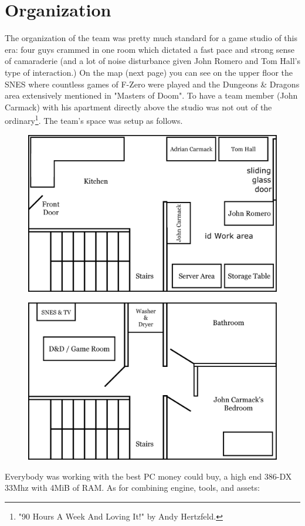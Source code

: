 \documentclass[book.tex]{subfiles}
\begin{document}
\section{Organization}
The organization of the team was pretty much standard for a game studio of this era: four guys crammed in one room which dictated a fast pace and strong sense of camaraderie (and a lot of noise disturbance given John Romero and Tom Hall's type of interaction.) On the map (next page) you can see on the upper floor the SNES where countless games of F-Zero were played and the Dungeons \& Dragons area extensively mentioned in "Masters of Doom". To have a team member (John Carmack) with his apartment directly above the studio was not out of the ordinary\footnote{ "90 Hours A Week And Loving It!" by Andy Hertzfeld.}. The team's space was setup as follows.
\par
\begin{figure}[H]
  \centering
  \includegraphics[width=\textwidth]{imgs/drawings/map/id-software-office-madison_bottom_floor.eps}
\end{figure}
\par
\begin{figure}[H]
  \centering
  \includegraphics[width=\textwidth]{imgs/drawings/map/id-software-office-madison_top_floor.eps}
\end{figure}
Everybody was working with the best PC money could buy, a high end 386-DX 33Mhz with 4MiB of RAM. As for combining engine, tools, and assets:\\
\end{document}
